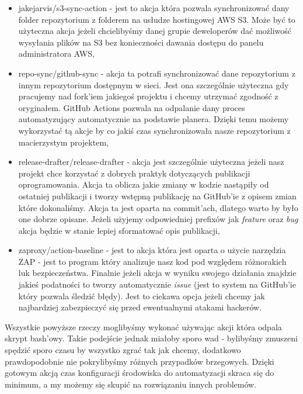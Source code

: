 \begin{itemize}
  \item jakejarvis/s3-sync-action - jest to akcja która pozwala synchronizować dany folder repozytorium z folderem na usłudze hostingowej AWS S3. Może być to użyteczna akcja jeżeli chcielibyśmy danej grupie deweloperów dać możliwość wysyłania plików na S3 bez konieczności dawania dostępu do panelu administratora AWS,
  \item repo-sync/github-sync - akcja ta potrafi synchronizować dane repozytorium z innym repozytorium dostępnym w sieci. Jest ona szczególnie użyteczna gdy pracujemy nad fork'iem jakiegoś projektu i chcemy utrzymać zgodność z oryginałem. GitHub Actions pozwala na odpalanie dany proces automatyzujący automatycznie na podstawie planera. Dzięki temu możemy wykorzystać tą akcje by co jakiś czas synchronizowała nasze repozytorium z macierzystym projektem,
  \item release-drafter/release-drafter - akcja jest szczególnie użyteczna jeżeli nasz projekt chce korzystać z dobrych praktyk dotyczących publikacji oprogramowania. Akcja ta oblicza jakie zmiany w kodzie nastąpiły od ostatniej publikacji i tworzy wstępną publikację na GitHub'ie z opisem zmian które dokonaliśmy. Akcja ta jest oparta na commit'ach, dlatego warto by było one dobrze opisane. Jeżeli użyjemy odpowiedniej prefixów jak \textit{feature} oraz \textit{bug} akcja będzie w stanie lepiej sformatować opis publikacji,
  \item zaproxy/action-baseline - jest to akcja która jest oparta o użycie narzędzia ZAP - jest to program który analizuje nasz kod pod względem różnorakich luk bezpieczeństwa. Finalnie jeżeli akcja w wyniku swojego działania znajdzie jakieś podatności to tworzy automatycznie \textit{issue} (jest to system na GitHub'ie który pozwala śledzić błędy). Jest to ciekawa opcja jeżeli chcemy jak najbardziej zabezpieczyć się przed ewentualnymi atakami hackerów.
\end{itemize}
Wszystkie powyższe rzeczy moglibyśmy wykonać używając akcji która odpala skrypt bash'owy. Takie podejście jednak miałoby sporo wad - bylibyśmy zmuszeni spędzić sporo czasu by wszystko zgrać tak jak chcemy, dodatkowo prawdopodobnie nie pokrylibyśmy różnych przypadków brzegowych. Dzięki gotowym akcją czas konfiguracji środowiska do automatyzacji skraca się do minimum, a my możemy się skupić na rozwiązaniu innych problemów.

